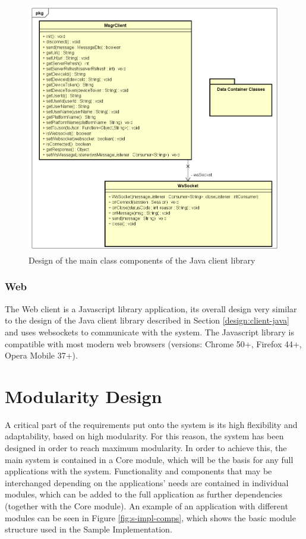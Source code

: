 \begin{figure}[H]
	\centering
	\includegraphics[width=1\textwidth]{figures/03_design/java-client-classes}
    \caption{Design of the main class components of the Java client library}
    \label{fig:java-client-classes}
\end{figure}

\subsubsection*{Web}
The Web client is a Javascript library application, its overall design very similar to the design of the Java client library described in Section \ref{design:client-java}  and uses websockets to communicate with the system. The Javascript library is compatible with most modern web browsers (versions: Chrome 50+, Firefox 44+, Opera Mobile 37+)\cite{fcm-web-client}.

\section{Modularity Design}

A critical part of the requirements put onto the system is its high flexibility and adaptability, based on high modularity. For this reason, the system has been designed in order to reach maximum modularity. In order to achieve this, the main system is contained in a Core module, which will be the basis for any full applications with the system. Functionality and components that may be interchanged depending on the applications' needs are contained in individual modules, which can be added to the full application as further dependencies (together with the Core module). An example of an application with different modules can be seen in Figure \ref{fig:s-impl-comps}, which shows the basic module structure used in the Sample Implementation.

